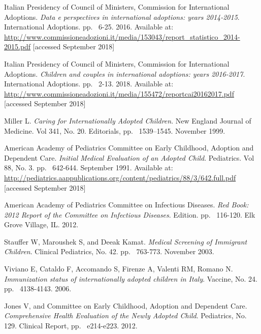 \begin{thebibliography}{50}
  Italian Presidency of Council of Ministers, Commission for International Adoptions.
  \textit{Data e perspectives in international adoptions: years 2014-2015}.
  International Adoptions.
  pp. ~6-25.
  2016.
  Available at: \url{http://www.commissioneadozioni.it/media/153043/report_statistico_2014-2015.pdf} [accessed September 2018]  
  
  Italian Presidency of Council of Ministers, Commission for International Adoptions.
  \textit{Children and couples in international adoptions: years 2016-2017}.
  International Adoptions.
  pp. ~2-13.
  2018.
  Available at: \url{http://www.commissioneadozioni.it/media/155472/reportcai20162017.pdf} [accessed September 2018]  
  
  Miller L.
  \textit{Caring for Internationally Adopted Children}.
  New England Journal of Medicine. Vol 341, No. 20.
  Editorials,
  pp. ~1539–1545.
  November 1999.
  
  American Academy of Pediatrics Committee on Early Childhood, Adoption and Dependent Care.
  \textit{Initial Medical Evaluation of an Adopted Child}.
  Pediatrics. Vol 88, No. 3.
  pp. ~642-644.
  September 1991.
  Available at: \url{http://pediatrics.aappublications.org/content/pediatrics/88/3/642.full.pdf} [accessed September 2018]
  
  American Academy of Pediatrics Committee on Infectious Diseases.
  \textit{Red Book: 2012 Report of the Committee on Infectious Diseases}.
   Edition.
  pp. ~116-120.
  Elk Grove Village, IL.
  2012.

  Stauffer W, Maroushek S, and Deeak Kamat.
  \textit{Medical Screening of Immigrant Children}.
  Clinical Pediatrics, No. 42.
  pp. ~763-773.
  November 2003.
  
  Viviano E, Cataldo F, Accomando S, Firenze A, Valenti RM, Romano N.
  \textit{Immunization status of internationally adopted children in Italy}.
  Vaccine, No. 24.
  pp. ~4138-4143.
  2006.
  
  Jones V, and Committee on Early Childhood, Adoption and Dependent Care.
  \textit{Comprehensive Health Evaluation of the Newly Adopted Child}.
  Pediatrics, No. 129.
  Clinical Report,
  pp. ~e214-e223.
  2012.
  

\end{thebibliography}
